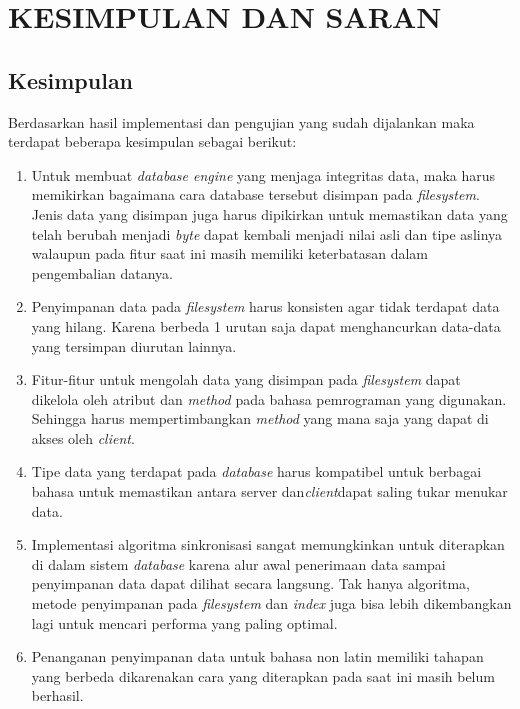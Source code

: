 
\chapter{KESIMPULAN DAN SARAN}

\section{Kesimpulan}

Berdasarkan hasil implementasi dan pengujian yang sudah dijalankan maka terdapat beberapa kesimpulan sebagai berikut:

\begin{enumerate}
	\item Untuk membuat \emph{database engine} yang menjaga integritas data, maka harus memikirkan bagaimana cara
	database tersebut disimpan pada \emph{filesystem}. Jenis data yang disimpan juga harus dipikirkan untuk memastikan
	data yang telah berubah menjadi \emph{byte} dapat kembali menjadi nilai asli dan tipe aslinya walaupun pada fitur saat ini 
	masih memiliki keterbatasan dalam pengembalian datanya.
	\item Penyimpanan data pada \emph{filesystem} harus konsisten agar tidak terdapat data yang hilang. Karena berbeda 1 urutan saja
	dapat menghancurkan data-data yang tersimpan diurutan lainnya.
	\item Fitur-fitur untuk mengolah data yang disimpan pada \emph{filesystem} dapat dikelola oleh atribut dan \emph{method}
	pada bahasa pemrograman yang digunakan. Sehingga harus mempertimbangkan \emph{method} yang mana saja yang dapat di akses oleh \emph{client}.
	\item Tipe data yang terdapat pada \emph{database} harus kompatibel untuk berbagai bahasa untuk memastikan antara server dan\emph{client}dapat saling
	tukar menukar data.
	\item Implementasi algoritma sinkronisasi sangat memungkinkan untuk diterapkan di dalam sistem \emph{database} karena alur awal penerimaan data sampai
	penyimpanan data dapat dilihat secara langsung. Tak hanya algoritma, metode penyimpanan pada \emph{filesystem} dan \emph{index} juga bisa lebih dikembangkan lagi
	untuk mencari performa yang paling optimal.
	\item Penanganan penyimpanan data untuk bahasa non latin memiliki tahapan yang berbeda dikarenakan cara yang diterapkan pada saat ini
	masih belum berhasil.
\end{enumerate}

